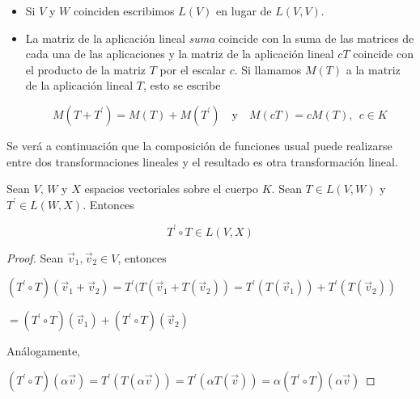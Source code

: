 \begin{remark}
\begin{itemize}
\item
Si $V$ y $W$ coinciden escribimos $L(V)$ en lugar de $L(V,V)$.

\item


La matriz de la aplicación lineal \textit{suma} coincide con la suma de las matrices de cada una de las aplicaciones y la matriz de la aplicación lineal $cT$ coincide con el producto de la matriz $T$ por el escalar $c$. Si llamamos $M(T)$ a la matriz de la aplicación lineal $T$, esto se escribe 

$$M(T+ T ^\prime) = M(T)+M(T ^\prime) \quad \text{y} \quad  M(cT) = cM(T),~ ~ c\in K$$ 
\end{itemize}
\end{remark}


\bigskip

\bigskip

Se verá a continuación que la composición de funciones usual puede realizarse entre dos transformaciones lineales y el resultado es otra transformación lineal.


\bigskip


\begin{theorem}
\label{Prop342}


Sean $V$, $W$ y $X$ espacios vectoriales sobre el cuerpo $K$. Sean $T\in L(V,W)$ y $T ^\prime\in L(W,X)$. Entonces 

$$ T ^\prime \circ T  \in L(V,X)$$

\begin{proof}

Sean $\vec{v}_1,\vec{v}_2  \in V      $, entonces

\bigskip

$(T ^\prime \circ T )( \vec{v}_1 + \vec{v}_2)= T ^\prime ( T ( \vec{v}_1+ T(\vec{v}_2))= T ^\prime ( T ( \vec{v}_1) )+  T ^\prime (  T(\vec{v}_2)) $

\bigskip

$= (T ^\prime \circ T )( \vec{v}_1)+  (T ^\prime \circ T )( \vec{v}_2) $

Análogamente,

\bigskip


$(T ^\prime \circ T )( \alpha \vec{v})= T ^\prime ( T ( \alpha \vec{v})) = T ^\prime (\alpha T (  \vec{v}))= \alpha  (T ^\prime  \circ T )( \alpha \vec{v})    $
\end{proof}
\end{theorem} 

